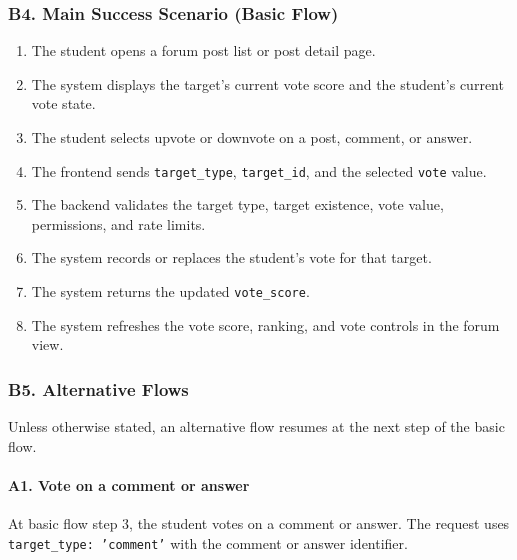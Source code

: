 \documentclass[12pt]{article}
\begin{document}
\hypertarget{sec:b4-main-success-scenario-basic-flow}{}
\subsubsection*{B4. Main Success Scenario (Basic Flow)}
\par\medskip

\begin{enumerate}
\item The student opens a forum post list or post detail page.
\item The system displays the target's current vote score and the student's current vote state.
\item The student selects upvote or downvote on a post, comment, or answer.
\item The frontend sends \texttt{target\_type}, \texttt{target\_id}, and the selected \texttt{vote} value.
\item The backend validates the target type, target existence, vote value, permissions, and rate limits.
\item The system records or replaces the student's vote for that target.
\item The system returns the updated \texttt{vote\_score}.
\item The system refreshes the vote score, ranking, and vote controls in the forum view.
\end{enumerate}
\par\medskip

\hypertarget{sec:b5-alternative-flows}{}
\subsubsection*{B5. Alternative Flows}
\par\medskip

Unless otherwise stated, an alternative flow resumes at the next step of the basic flow.
\par\medskip

\hypertarget{sec:a1-vote-on-a-comment-or-answer}{}
\paragraph*{A1. Vote on a comment or answer}
\par\medskip

At basic flow step 3, the student votes on a comment or answer. The request uses \texttt{target\_type: 'comment'} with the comment or answer identifier.
\par\medskip
\end{document}

